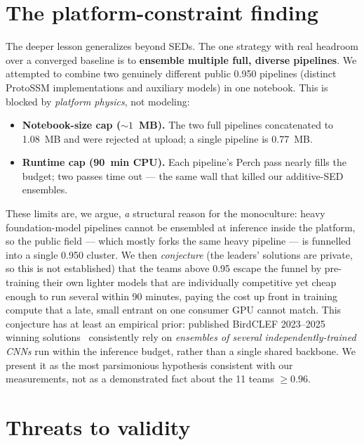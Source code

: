 \documentclass{ceurart}
\begin{document}
\section{The platform-constraint finding}
\label{sec:platform}

The deeper lesson generalizes beyond SEDs. The one strategy with real headroom over
a converged baseline is to \textbf{ensemble multiple full, diverse pipelines}. We
attempted to combine two genuinely different public 0.950 pipelines (distinct
ProtoSSM implementations and auxiliary models) in one notebook. This is blocked by
\emph{platform physics}, not modeling:

\begin{itemize}
  \item \textbf{Notebook-size cap (${\sim}1$~MB).} The two full pipelines
        concatenated to 1.08~MB and were rejected at upload; a single pipeline is
        0.77~MB.
  \item \textbf{Runtime cap (90~min CPU).} Each pipeline's Perch pass nearly fills
        the budget; two passes time out --- the same wall that killed our
        additive-SED ensembles.
\end{itemize}

These limits are, we argue, \emph{a} structural reason for the monoculture: heavy
foundation-model pipelines cannot be ensembled at inference inside the platform, so
the public field --- which mostly forks the same heavy pipeline --- is funnelled
into a single 0.950 cluster. We then \emph{conjecture} (the leaders' solutions are
private, so this is not established) that the teams above 0.95 escape the funnel by
pre-training their own lighter models that are individually competitive yet cheap
enough to run several within 90 minutes, paying the cost up front in training
compute that a late, small entrant on one consumer GPU cannot match. This
conjecture has at least an empirical prior: published BirdCLEF 2023--2025 winning
solutions~\cite{lifeclef-overview} consistently rely on \emph{ensembles of several
independently-trained CNNs} run within the inference budget, rather than a single
shared backbone. We present it as the most parsimonious hypothesis consistent with
our measurements, not as a demonstrated fact about the 11 teams $\geq 0.96$.

\section{Threats to validity}
\label{sec:threats}
\end{document}
